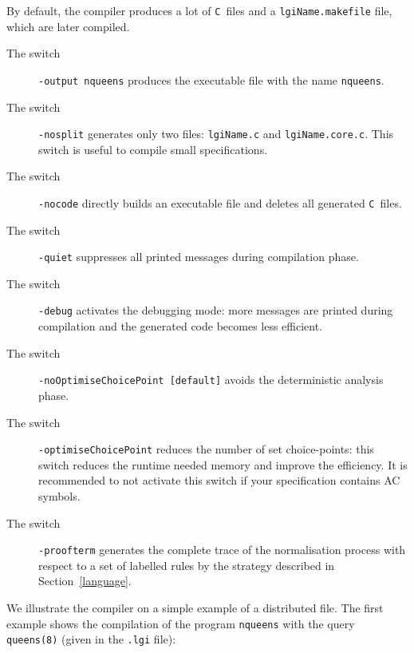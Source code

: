\noindent
By default, the compiler produces a lot of \verb|C|~files and a
\texttt{lgiName.makefile} file, which are later compiled.
\begin{description}
\item [The switch] \verb|-output nqueens| produces the executable
  file with the name \verb|nqueens|. 

\item [The switch] \verb|-nosplit| generates only two files:
  \texttt{lgiName.c} and \texttt{lgiName.core.c}. This switch is
  useful to compile small specifications.

\item [The switch] \verb|-nocode| directly builds an executable file and
  deletes all generated \verb|C|~files. 

\item [The switch] \verb|-quiet| suppresses all printed messages during
  compilation phase.

\item [The switch] \verb|-debug| activates the debugging mode: more
  messages are printed during compilation and the generated code becomes
  less efficient.

\item [The switch] \verb|-noOptimiseChoicePoint [default]| avoids the 
  deterministic analysis phase.

\item [The switch] \verb|-optimiseChoicePoint| reduces the number of
  set choice-points: this switch reduces the runtime needed memory and
  improve the efficiency.
  It is recommended to not activate this switch if your specification
  contains AC symbols.

\item [The switch] \verb|-proofterm| generates the complete trace of the
  normalisation process with respect to a set of labelled rules by the
  strategy  described in Section~\ref{language}.
\end{description}

\noindent
We illustrate the compiler on a simple example of a distributed file.
The first example shows the compilation of the program \verb|nqueens|
with the query \verb|queens(8)| (given in the \texttt{.lgi} file):

